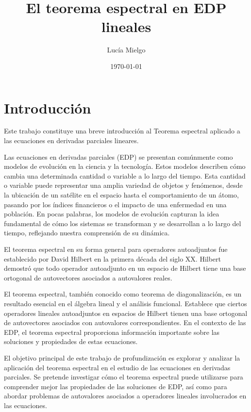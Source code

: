 \documentclass{article}
\title {\huge \textbf{El teorema espectral en EDP lineales}}
\author{Lucía Mielgo}
\date{\today}
\begin{document}
\maketitle %
\newpage

\renewcommand{\contentsname}{Índice} 
\tableofcontents
\newpage
\section{Introducción}
Este trabajo constituye una breve introducción al Teorema espectral aplicado a las ecuaciones en derivadas parciales lineares.

Las ecuaciones en derivadas parciales (EDP) se presentan comúnmente como modelos de evolución en la ciencia y la tecnología. Estos modelos describen cómo cambia una determinada cantidad o variable a lo largo del tiempo. Esta cantidad o variable puede representar una amplia variedad de objetos y fenómenos, desde la ubicación de un satélite en el espacio hasta el comportamiento de un átomo, pasando por los índices financieros o el impacto de una enfermedad en una población. En pocas palabras, los modelos de evolución capturan la idea fundamental de cómo los sistemas se transforman y se desarrollan a lo largo del tiempo, reflejando nuestra comprensión de su dinámica.

El teorema espectral en su forma general para operadores autoadjuntos fue establecido por David Hilbert en la primera década del siglo XX. Hilbert demostró que todo operador autoadjunto en un espacio de Hilbert tiene una base ortogonal de autovectores asociados a autovalores reales.

El teorema espectral, también conocido como teorema de diagonalización, es un resultado esencial en el álgebra lineal y el análisis funcional. Establece que ciertos operadores lineales autoadjuntos en espacios de Hilbert tienen una base ortogonal de autovectores asociados con autovalores correspondientes. En el contexto de las EDP, el teorema espectral proporciona información importante sobre las soluciones y propiedades de estas ecuaciones.

El objetivo principal de este trabajo de profundización es explorar y analizar la aplicación del teorema espectral en el estudio de las ecuaciones en derivadas parciales. Se pretende investigar cómo el teorema espectral puede utilizarse para comprender mejor las propiedades de las soluciones de EDP, así como para abordar problemas de autovalores asociados a operadores lineales involucrados en las ecuaciones.
\end{document}

